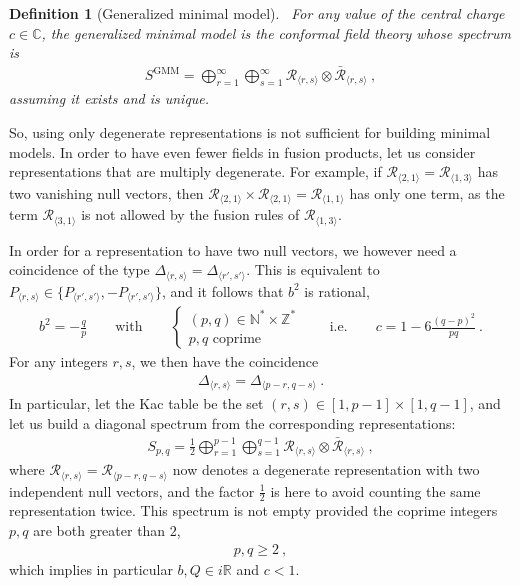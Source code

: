 \documentclass[12pt, a4paper]{article}
\theoremstyle{break}
\newtheorem{defn}[exo]{Definition}
\begin{document}
\begin{defn}[Generalized minimal model]
 ~\label{def:gmm}
 For any value of the central charge $c\in\mathbb{C}$, the generalized minimal model is the conformal field theory whose spectrum is
 \begin{align}
  S^\mathrm{GMM} = \bigoplus_{r=1}^\infty \bigoplus_{s=1}^\infty \mathcal{R}_{\langle r,s \rangle}\otimes  \mathcal{\bar R}_{\langle r,s \rangle} \ ,
 \end{align}
 assuming it exists and is unique.
\end{defn}

So, using only degenerate representations is not sufficient for building minimal models.
In order to have even fewer fields in fusion products, let us consider representations that are multiply degenerate. For example, if $\mathcal{R}_{\langle 2, 1\rangle} = \mathcal{R}_{\langle 1, 3\rangle}$ has two vanishing null vectors, then $\mathcal{R}_{\langle 2, 1\rangle} \times \mathcal{R}_{\langle 2, 1\rangle} = \mathcal{R}_{\langle 1,1\rangle}$ has only one term, as the term $\mathcal{R}_{\langle 3, 1\rangle}$ is not allowed by the fusion rules of $\mathcal{R}_{\langle 1, 3\rangle}$.

In order for a representation to have two null vectors, we however need a coincidence of 
the type $\Delta_{\langle r,s \rangle} = \Delta_{\langle r',s' \rangle}$. 
This is equivalent to $P_{\langle r,s \rangle} \in \{ P_{\langle r',s' \rangle}, -P_{\langle r',s' \rangle}\}$, and it follows that
$b^2$ is rational,
\begin{align} 
 b^2 = - \frac{q}{p} \qquad \text{with} \qquad \left\{\begin{array}{l} (p,q)\in \mathbb{N}^*\times \mathbb{Z}^* \\ p, q\text{ coprime} \end{array} \right. 
 \qquad \text{i.e.} \qquad c = 1-6\frac{(q-p)^2}{pq}\ .
 \label{eq:bcmin}
\end{align}
For any integers $r,s$, we then have the coincidence 
\begin{align}
 \Delta_{\langle r,s \rangle} = \Delta_{\langle p-r, q-s\rangle}\ .
\end{align}
In particular, let the Kac table be the set $(r,s)\in [1, p-1]\times [1,q-1]$, and let us build a diagonal spectrum from the corresponding representations:
\begin{align}
 S_{p, q} = \frac12 \bigoplus_{r=1}^{p-1} \bigoplus_{s=1}^{q-1} \mathcal{R}_{\langle r,s \rangle}\otimes \mathcal{\bar{R}}_{\langle r,s \rangle}\ ,
\end{align}
where  $\mathcal{R}_{\langle r,s \rangle}=\mathcal{R}_{\langle p-r,q-s \rangle}$ now denotes a degenerate representation with two independent null vectors, and the factor $\frac12$ is here to avoid counting the same representation twice.
This spectrum is not empty provided the coprime integers $p,q$ are both greater than $2$,
\begin{align}
 p,q \geq 2 \ ,
 \label{eq:pqmin}
\end{align}
which implies in particular $b,Q\in i\mathbb{R}$ and $c<1$.
\end{document}
